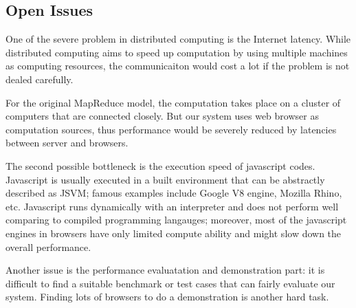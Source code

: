 \subsection{Open Issues}

One of the severe problem in distributed computing is the Internet latency. While distributed computing aims to speed up computation by using multiple machines as computing resources, the communicaiton would cost a lot if the problem is not dealed carefully.

For the original MapReduce model, the computation takes place on a cluster of computers that are connected closely\cite{mapreduce}. But our system uses web browser as computation sources, thus performance would be severely reduced by latencies between server and browsers.

The second possible bottleneck is the execution speed of javascript codes. Javascript is usually executed in a built environment that can be abstractly described as JSVM; famous examples include Google V8 engine\cite{v8}, Mozilla Rhino\cite{rhino}, etc.
Javascript runs dynamically with an interpreter and does not perform well comparing to compiled programming langauges; moreover, most of the javascript engines in browsers have only limited compute ability and might slow down the overall performance.

Another issue is the performance evaluatation and demonstration part: it is difficult to find a suitable benchmark or test cases that can fairly evaluate our system. Finding lots of browsers to do a demonstration is another hard task.
